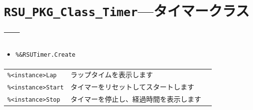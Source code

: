 \section{\texttt{RSU\_PKG\_Class\_Timer}\;---\;タイマークラス\;---}\label{sec:RSU_PKG_Class_Timer}
\paragraph{\DocStrTitleClassCreationFunction}
\begin{itemize}
\item\texttt{\%\&RSUTimer.Create}
\end{itemize}
\paragraph{\DocStrTitleClassFunctionList}
\begin{center}
{\footnotesize
\begin{xltabular}{\textwidth}{|p{3.5truecm}|X|p{1.5truecm}|}
\hline
\thead{\DocStrHeaderFunctionName}&\thead{\DocStrDescription}&\thead{\DocStrRefto}\\
\hline
\hline
\texttt{\%<instance>Lap}&ラップタイムを表示します&\\
\hline
\texttt{\%<instance>Start}&タイマーをリセットしてスタートします&\\
\hline
\texttt{\%<instance>Stop}&タイマーを停止し、経過時間を表示します&\\
\hline
\end{xltabular}
}
\end{center}
